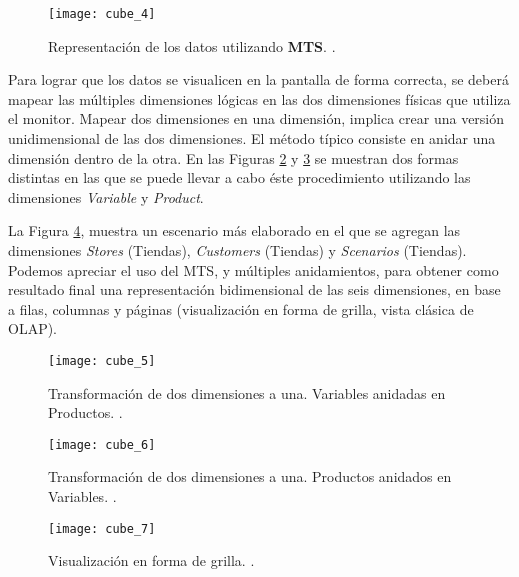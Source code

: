 \documentclass[a4paper,11pt]{article}
\begin{document}
    \begin{figure}
      \begin{center}
        \texttt{[image: cube\_4]}
        \caption{Representación de los datos utilizando \textbf{MTS}. \cite[p.~55]{olap_solutions}.}
        \label{cube_4}
      \end{center}
    \end{figure}
    
    
    Para lograr que los datos se visualicen en la pantalla de forma correcta, se deberá mapear las múltiples dimensiones lógicas en las dos dimensiones físicas
    que utiliza el monitor.
    Mapear dos dimensiones en una dimensión, implica crear una versión unidimensional de las dos dimensiones.
    El método típico consiste en anidar una dimensión dentro de la otra. En las Figuras \ref{cube_5} y \ref{cube_6} se muestran dos formas distintas en las que
    se puede llevar a cabo éste procedimiento utilizando las dimensiones \textit{Variable} y \textit{Product}.
    
    La Figura \ref{cube_7}, muestra un escenario más elaborado en el que se agregan las dimensiones \textit{Stores} (Tiendas), \textit{Customers} (Tiendas)
    y \textit{Scenarios} (Tiendas). Podemos apreciar el uso del MTS, y múltiples anidamientos, para obtener como resultado final una representación
    bidimensional de las seis dimensiones, en base a filas, columnas y páginas (visualización en forma de grilla, vista clásica de OLAP).
    
    \begin{figure}
      \begin{center}
        \texttt{[image: cube\_5]}
        \caption{Transformación de dos dimensiones a una. Variables anidadas en Productos. \cite[p.~58]{olap_solutions}.}
        \label{cube_5}
      \end{center}
    \end{figure}
    
    \begin{figure}
      \begin{center}
        \texttt{[image: cube\_6]}
        \caption{Transformación de dos dimensiones a una. Productos anidados en Variables. \cite[p.~58]{olap_solutions}.}
        \label{cube_6}
      \end{center}
    \end{figure}
    
    \begin{figure}
      \begin{center}
        \texttt{[image: cube\_7]}
        \caption{Visualización en forma de grilla. \cite[p.~60]{olap_solutions}.}
        \label{cube_7}
      \end{center}
    \end{figure}
    
\end{document}
